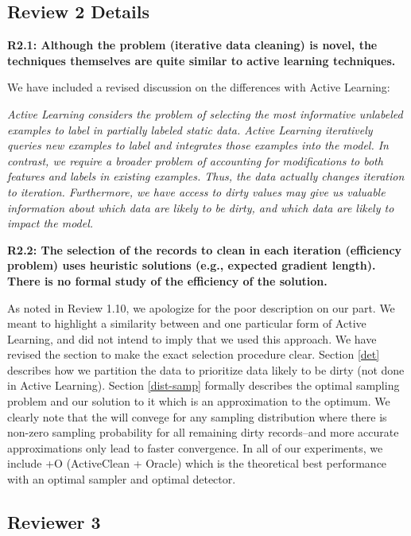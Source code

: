 \subsection*{Review 2 Details}

\noindent\textbf{R2.1: Although the problem (iterative data cleaning) is novel, the techniques themselves are quite similar to active learning techniques.}

\noindent  We have included a revised discussion on the differences with Active Learning:

\emph{Active Learning considers the problem of selecting the most informative unlabeled examples to label in partially labeled static data.
Active Learning iteratively queries new examples to label and integrates those examples into the model.
In contrast, we require a broader problem of accounting for modifications to both features and labels in existing examples.
Thus, the data actually changes iteration to iteration.
Furthermore, we have access to dirty values may give us valuable information about which data are likely to be dirty, and which data are likely to impact the model. }

\vspace{0.5em}

\noindent\textbf{R2.2: The selection of the records to clean in each iteration (efficiency problem) uses heuristic solutions (e.g., expected gradient length). There is no formal study of the efficiency of the solution.}

\noindent  As noted in Review 1.10, we apologize for the poor description on our part. We meant to highlight a similarity between \sys and one particular form of Active Learning, and did not intend to imply that we used this approach. 
We have revised the section to make the exact selection procedure clear. Section \ref{det} describes how we partition the data to prioritize data likely to be dirty (not done in Active Learning). Section \ref{dist-samp} formally describes the optimal sampling problem and our solution to it which is an approximation to the optimum. We clearly note that the \sys will convege for any sampling distribution where there is non-zero sampling probability for all remaining dirty records--and more accurate approximations only lead to faster convergence. In all of our experiments, we include \sys+O (ActiveClean + Oracle) which is the theoretical best performance with an optimal sampler and optimal detector.

 \subsection*{Reviewer 3}

